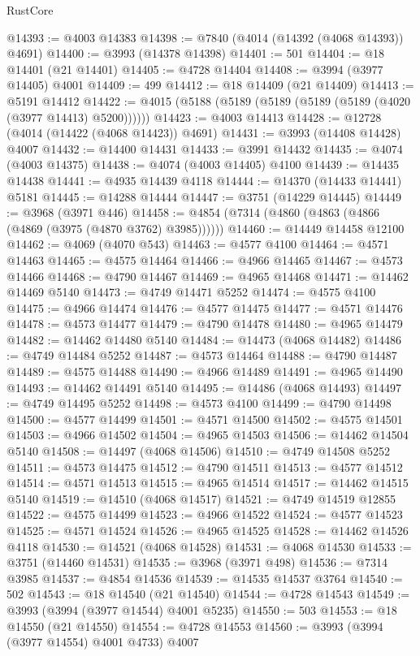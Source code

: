 \begin{lexlean}{RustCore}
\begin{coremodule}
@14393 := @4003 @14383
@14398 := @7840 (@4014 (@14392 (@4068 @14393)) @4691)
@14400 := @3993 (@14378 @14398)
@14401 := 501
@14404 := @18 @14401 (@21 @14401)
@14405 := @4728 @14404
@14408 := @3994 (@3977 @14405) @4001
@14409 := 499
@14412 := @18 @14409 (@21 @14409)
@14413 := @5191 @14412
@14422 := @4015 (@5188 (@5189 (@5189 (@5189 (@5189 (@4020 (@3977 @14413) @5200))))))
@14423 := @4003 @14413
@14428 := @12728 (@4014 (@14422 (@4068 @14423)) @4691)
@14431 := @3993 (@14408 @14428) @4007
@14432 := @14400 @14431
@14433 := @3991 @14432
@14435 := @4074 (@4003 @14375)
@14438 := @4074 (@4003 @14405) @4100
@14439 := @14435 @14438
@14441 := @4935 @14439 @4118
@14444 := @14370 (@14433 @14441) @5181
@14445 := @14288 @14444
@14447 := @3751 (@14229 @14445)
@14449 := @3968 (@3971 @446)
@14458 := @4854 (@7314 (@4860 (@4863 (@4866 (@4869 (@3975 (@4870 @3762) @3985))))))
@14460 := @14449 @14458 @12100
@14462 := @4069 (@4070 @543)
@14463 := @4577 @4100
@14464 := @4571 @14463
@14465 := @4575 @14464
@14466 := @4966 @14465
@14467 := @4573 @14466
@14468 := @4790 @14467
@14469 := @4965 @14468
@14471 := @14462 @14469 @5140
@14473 := @4749 @14471 @5252
@14474 := @4575 @4100
@14475 := @4966 @14474
@14476 := @4577 @14475
@14477 := @4571 @14476
@14478 := @4573 @14477
@14479 := @4790 @14478
@14480 := @4965 @14479
@14482 := @14462 @14480 @5140
@14484 := @14473 (@4068 @14482)
@14486 := @4749 @14484 @5252
@14487 := @4573 @14464
@14488 := @4790 @14487
@14489 := @4575 @14488
@14490 := @4966 @14489
@14491 := @4965 @14490
@14493 := @14462 @14491 @5140
@14495 := @14486 (@4068 @14493)
@14497 := @4749 @14495 @5252
@14498 := @4573 @4100
@14499 := @4790 @14498
@14500 := @4577 @14499
@14501 := @4571 @14500
@14502 := @4575 @14501
@14503 := @4966 @14502
@14504 := @4965 @14503
@14506 := @14462 @14504 @5140
@14508 := @14497 (@4068 @14506)
@14510 := @4749 @14508 @5252
@14511 := @4573 @14475
@14512 := @4790 @14511
@14513 := @4577 @14512
@14514 := @4571 @14513
@14515 := @4965 @14514
@14517 := @14462 @14515 @5140
@14519 := @14510 (@4068 @14517)
@14521 := @4749 @14519 @12855
@14522 := @4575 @14499
@14523 := @4966 @14522
@14524 := @4577 @14523
@14525 := @4571 @14524
@14526 := @4965 @14525
@14528 := @14462 @14526 @4118
@14530 := @14521 (@4068 @14528)
@14531 := @4068 @14530
@14533 := @3751 (@14460 @14531)
@14535 := @3968 (@3971 @498)
@14536 := @7314 @3985
@14537 := @4854 @14536
@14539 := @14535 @14537 @3764
@14540 := 502
@14543 := @18 @14540 (@21 @14540)
@14544 := @4728 @14543
@14549 := @3993 (@3994 (@3977 @14544) @4001 @5235)
@14550 := 503
@14553 := @18 @14550 (@21 @14550)
@14554 := @4728 @14553
@14560 := @3993 (@3994 (@3977 @14554) @4001 @4733) @4007

\end{coremodule}
\end{lexlean}

